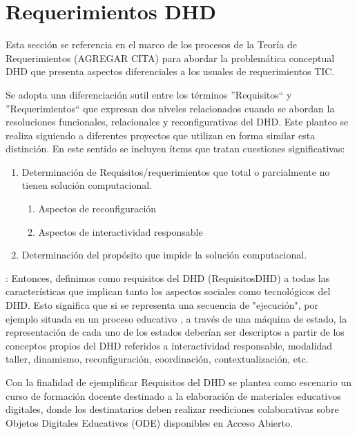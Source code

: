 \section{Requerimientos DHD} \label{requerimientosdhd}

Esta sección se referencia en el marco de los procesos de la Teoría de Requerimientos (AGREGAR CITA) para abordar la problemática conceptual DHD que presenta aspectos diferenciales a los usuales de requerimientos TIC. 

Se adopta una diferenciación sutil entre los términos ''Requisitos`` y ''Requerimientos`` que expresan dos
niveles relacionados cuando se abordan la resoluciones funcionales,
relacionales y reconfigurativas del DHD. Este planteo se realiza siguiendo a diferentes
proyectos \cite{requerimiento1,requerimiento2,requerimiento3,requerimiento4} que
utilizan en forma similar esta distinción.
En este sentido se incluyen ítems que tratan cuestiones
significativas: 

\begin{enumerate} \label{requerimientositems}
 \item  Determinación de Requisitos/requerimientos que total o parcialmente
no tienen solución computacional.
 
 \begin{enumerate}
 \item Aspectos de reconfiguración 
 \item Aspectos de interactividad responsable 
 \end{enumerate}
\item Determinación del propósito que impide la solución computacional.

\end{enumerate}

\begin{defi} : 
Entonces, definimos como requisitos del DHD (RequisitosDHD) a
todas las características que implican tanto los aspectos sociales como tecnológicos del
DHD. Esto significa que si se representa una secuencia de "ejecución", por
ejemplo situada en un proceso educativo \cite{cacic2007}, a través de una
máquina de estado, la representación de cada uno de los estados deberían ser
descriptos a partir de los conceptos propios del DHD referidos a interactividad responsable, modalidad taller, dinamismo, reconfiguración,
coordinación, contextualización, etc.
\end{defi} \label{requisito}

Con la finalidad de ejemplificar Requisitos del DHD se plantea como escenario un curso de formación docente destinado a la elaboración de materiales educativos digitales, donde los destinatarios deben realizar reediciones colaborativas sobre Objetos Digitales Educativos (ODE) disponibles en Acceso Abierto.

